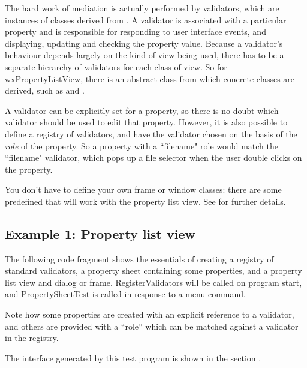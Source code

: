 The hard work of mediation is actually performed by validators, which are instances of classes
derived from . A validator is associated with
a particular property and is responsible for
responding to user interface events, and displaying, updating and checking the property value.
Because a validator's behaviour depends largely on the kind of view being used, there has to be
a separate hierarchy of validators for each class of view. So for wxPropertyListView, there is
an abstract class  from which concrete
classes are derived, such as  and
\rtfsp{}.

A validator can be explicitly set for a property, so there is no doubt which validator
should be used to edit that property. However, it is also possible to define a registry
of validators, and have the validator chosen on the basis of the {\it role} of the property.
So a property with a ``filename" role would match the ``filename" validator, which pops
up a file selector when the user double clicks on the property.

You don't have to define your own frame or window classes: there are some predefined
that will work with the property list view. See  for
further details.

\subsection{Example 1: Property list view}

The following code fragment shows the essentials of creating a registry of
standard validators, a property sheet containing some properties, and
a property list view and dialog or frame. RegisterValidators will be
called on program start, and PropertySheetTest is called in response to a
menu command.

Note how some properties are created with an explicit reference to
a validator, and others are provided with a ``role'' which can be matched
against a validator in the registry.

The interface generated by this test program is shown in the section .

